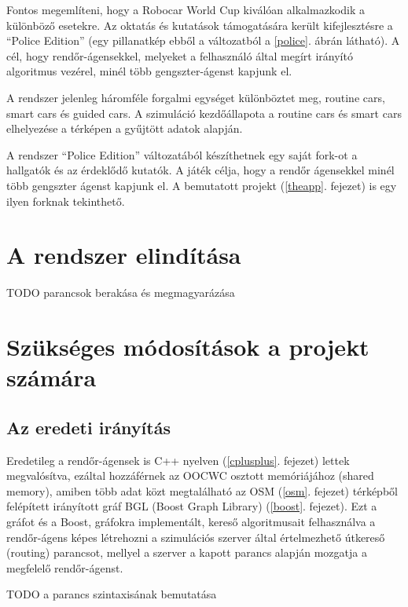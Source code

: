 \documentclass[a4paper,12pt]{report}
\begin{document}
\vspace{2mm}
Fontos megemlíteni, hogy a Robocar World Cup kiválóan alkalmazkodik a különböző esetekre. Az oktatás és kutatások támogatására került kifejlesztésre a ``Police Edition'' (egy pillanatkép ebből a változatból a \ref{police}. ábrán látható). A cél, hogy rendőr-ágensekkel, melyeket a felhasználó által megírt irányító algoritmus vezérel, minél több gengszter-ágenst kapjunk el.

\vspace{2mm}
A rendszer jelenleg háromféle forgalmi egységet különböztet meg, routine cars, smart cars és guided cars. A szimuláció kezdőállapota a routine cars és smart cars elhelyezése a térképen a gyűjtött adatok alapján.

\vspace{2mm}
A rendszer ``Police Edition'' változatából készíthetnek egy saját fork-ot a hallgatók és az érdeklődő kutatók. A játék célja, hogy a rendőr ágensekkel minél több gengszter ágenst kapjunk el. A bemutatott projekt (\ref{theapp}. fejezet) is egy ilyen forknak tekinthető.

\section{A rendszer elindítása}
\label{howtostart}

TODO parancsok berakása és megmagyarázása

\section{Szükséges módosítások a projekt számára}
\label{changes}

\subsection{Az eredeti irányítás}
\label{originalrouting}
Eredetileg a rendőr-ágensek is C++ nyelven (\ref{cplusplus}. fejezet) lettek megvalósítva, ezáltal hozzáférnek az OOCWC osztott memóriájához (shared memory), amiben több adat közt megtalálható az OSM \citep{osm} (\ref{osm}. fejezet) térképből felépített irányított gráf BGL (Boost Graph Library) (\ref{boost}. fejezet). Ezt a gráfot és a Boost, gráfokra implementált, kereső algoritmusait felhasználva a rendőr-ágens képes létrehozni a szimulációs szerver által értelmezhető útkereső (routing) parancsot, mellyel a szerver a kapott parancs alapján mozgatja a megfelelő rendőr-ágenst. 

\vspace{2mm}
TODO a parancs szintaxisának bemutatása
\end{document}
